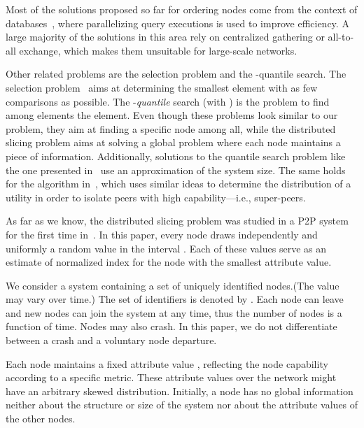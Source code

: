 \documentclass[times,10pt,twocolumn]{article}
\begin{document}
\label{related}
Most of the solutions proposed so far for ordering nodes come
from the context of databases~\cite{DNS91,IRV89},
where parallelizing query executions is used to improve efficiency. 
A large majority of the solutions in this area rely on centralized gathering
or all-to-all exchange, which makes them unsuitable 
for large-scale networks.

Other related problems are the selection problem and the -quantile search.
The selection problem~\cite{FR75} aims at determining the 
smallest element with as few comparisons as possible.
The -\emph{quantile} search (with 
) is the problem to find among  elements the  element.
Even though these problems look similar to our problem, 
they aim 
at finding a specific node among all, while the distributed slicing problem aims
at solving a global problem where each node maintains a piece of
information.  
Additionally, solutions to the quantile search problem like the one presented 
in~\cite{KDG03} use an approximation of the system size. The same holds 
for the algorithm in~\cite{SDCM06}, which uses similar ideas to determine the distribution
of a utility in order to isolate peers with high capability---i.e., super-peers.

As far as we know, the distributed slicing problem was studied in a P2P system 
for the first time in~\cite{JK06}. 
In this paper, every node draws independently and uniformly a random value in the
interval . Each of these values serve as an estimate of normalized index 
for the node with the  smallest attribute value.

\label{model}


We  consider a  system  containing  a set
of  uniquely identified nodes.(The value  may vary over time.)
The set of identifiers is denoted by .
Each node can leave and new nodes can join the system at any  
time, thus the number of nodes is a function of time.
Nodes may also crash. In this paper,
we do not differentiate between a crash and a voluntary node departure. 

Each node  maintains a fixed attribute value , reflecting the node
capability according to a specific metric.
These attribute values over the network might have an arbitrary
skewed distribution.
Initially, a node
has no global information neither about the structure or size of the system nor
about 
the attribute values of the other nodes. 
\end{document}
